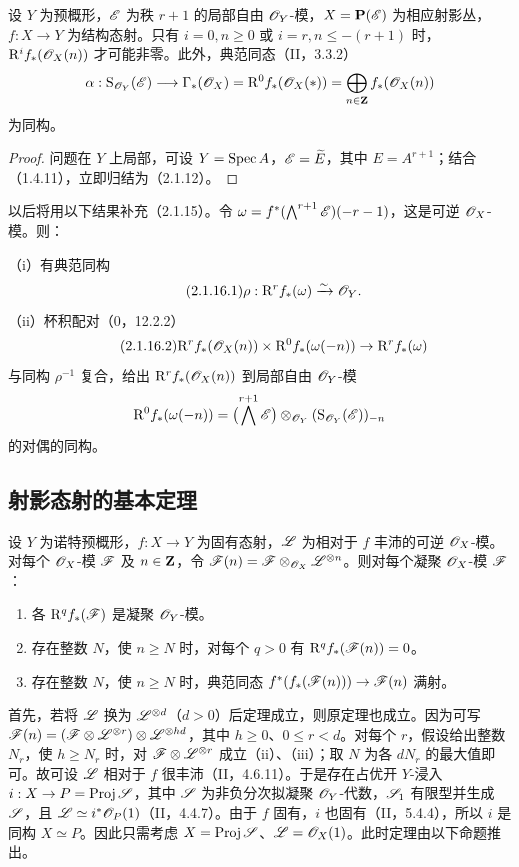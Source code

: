 设 $Y$ 为预概形，$\mathscr E$ 为秩 $r+1$ 的局部自由 $\mathscr O_Y$-模，$X=\mathbf P(\mathscr E)$ 为相应射影丛，$f:X\to Y$ 为结构态射。只有 $i=0,n\geq0$ 或 $i=r,n\leq-(r+1)$ 时，$\mathrm R^if_*(\mathscr O_X(n))$ 才可能非零。此外，典范同态（II，3.3.2）
\[
\alpha:\operatorname{S}_{\mathscr O_Y}(\mathscr E)\longrightarrow\Gamma_*(\mathscr O_X)
=\mathrm R^0f_*(\mathscr O_X(*))=\bigoplus_{n\in\mathbf Z}f_*(\mathscr O_X(n))
\]
为同构。
\begin{proof}
问题在 $Y$ 上局部，可设 $Y=\operatorname{Spec} A$，$\mathscr E=\widetilde{E}$，其中 $E=A^{r+1}$；结合（1.4.11），立即归结为（2.1.12）。
\end{proof}

以后将用以下结果补充（2.1.15）。令 $\omega=f^*(\bigwedge^{r+1}\mathscr E)(-r-1)$，这是可逆 $\mathscr O_X$-模。则：

（i）有典范同构
\begin{equation}\tag{2.1.16.1}
\rho:\mathrm R^rf_*(\omega)\xrightarrow{\sim}\mathscr O_Y.
\end{equation}
（ii）杯积配对（0，12.2.2）
\begin{equation}\tag{2.1.16.2}
\mathrm R^rf_*(\mathscr O_X(n))\times\mathrm R^0f_*(\omega(-n))\to\mathrm R^rf_*(\omega)
\end{equation}
与同构 $\rho^{-1}$ 复合，给出 $\mathrm R^rf_*(\mathscr O_X(n))$ 到局部自由 $\mathscr O_Y$-模
\[
\mathrm R^0f_*(\omega(-n))=\bigl(\bigwedge^{r+1}\mathscr E\bigr)\otimes_{\mathscr O_Y}
(\operatorname{S}_{\mathscr O_Y}(\mathscr E))_{-n}
\]
的对偶的同构。\par

\subsection{射影态射的基本定理}
设 $Y$ 为诺特预概形，$f:X\to Y$ 为固有态射，$\mathscr L$ 为相对于 $f$ 丰沛的可逆 $\mathscr O_X$-模。对每个 $\mathscr O_X$-模 $\mathscr F$ 及 $n\in\mathbf Z$，令 $\mathscr F(n)=\mathscr F\otimes_{\mathscr O_X}\mathscr L^{\otimes n}$。则对每个凝聚 $\mathscr O_X$-模 $\mathscr F$：
\begin{enumerate}[label=(\roman*)]
\item 各 $\mathrm R^qf_*(\mathscr F)$ 是凝聚 $\mathscr O_Y$-模。
\item 存在整数 $N$，使 $n\geq N$ 时，对每个 $q>0$ 有 $\mathrm R^qf_*(\mathscr F(n))=0$。
\item 存在整数 $N$，使 $n\geq N$ 时，典范同态 $f^*(f_*(\mathscr F(n)))\to\mathscr F(n)$ 满射。
\end{enumerate}
\eproof 首先，若将 $\mathscr L$ 换为 $\mathscr L^{\otimes d}$（$d>0$）后定理成立，则原定理也成立。因为可写
$\mathscr F(n)=(\mathscr F\otimes\mathscr L^{\otimes r})\otimes\mathscr L^{\otimes hd}$，其中 $h\geq0$、$0\leq r<d$。对每个 $r$，假设给出整数 $N_r$，使 $h\geq N_r$ 时，对 $\mathscr F\otimes\mathscr L^{\otimes r}$ 成立（ii）、（iii）；取 $N$ 为各 $dN_r$ 的最大值即可。故可设 $\mathscr L$ 相对于 $f$ 很丰沛（II，4.6.11）。于是存在占优开 $Y$-浸入 $i:X\to P=\operatorname{Proj}\mathscr S$，其中 $\mathscr S$ 为非负分次拟凝聚 $\mathscr O_Y$-代数，$\mathscr S_1$ 有限型并生成 $\mathscr S$，且 $\mathscr L\simeq i^*\mathscr O_P(1)$（II，4.4.7）。由于 $f$ 固有，$i$ 也固有（II，5.4.4），所以 $i$ 是同构 $X\simeq P$。因此只需考虑 $X=\operatorname{Proj}\mathscr S$、$\mathscr L=\mathscr O_X(1)$。此时定理由以下命题推出。


